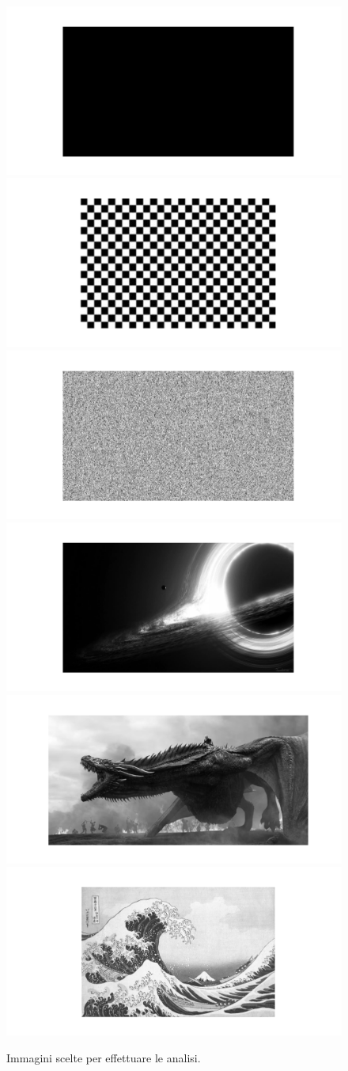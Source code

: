\begin{figure}[h]
    \centering
    \includegraphics[width = .3\textwidth]{hw-1/report/imgs/black.png}
    \includegraphics[width = .3\textwidth]{hw-1/report/imgs/chessboard.png}
    \includegraphics[width = .3\textwidth]{hw-1/report/imgs/gaussian-noise.png}
    \includegraphics[width = .3\textwidth]{hw-1/report/imgs/interstellar.png}
    \includegraphics[width = .3\textwidth]{hw-1/report/imgs/dragon.png}
    \includegraphics[width = .3\textwidth]{hw-1/report/imgs/great-wave.png}
    \caption{Immagini scelte per effettuare le analisi. }
    \label{fig:all-figures-final}
\end{figure}

